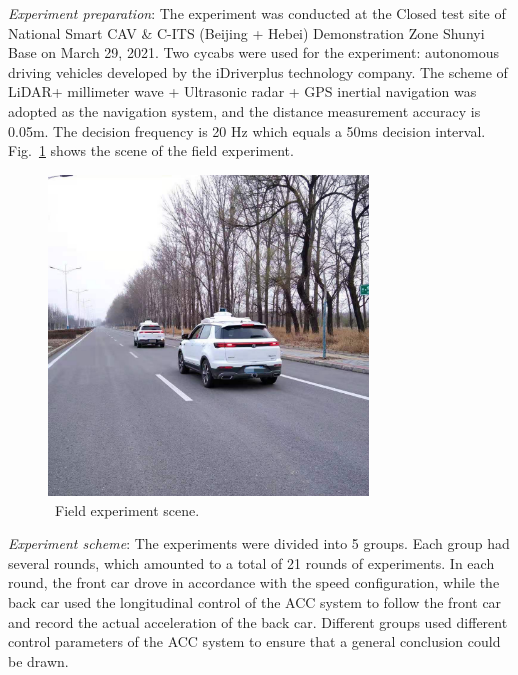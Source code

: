 \documentclass[journal]{IEEEtran}
\begin{document}
\textit{Experiment preparation}: The experiment was conducted at the Closed test site of National Smart CAV \& C-ITS (Beijing + Hebei) Demonstration Zone Shunyi Base on March 29, 2021. Two cycabs were used for the experiment: autonomous driving vehicles developed by the iDriverplus technology company. The scheme of LiDAR+ millimeter wave + Ultrasonic radar + GPS inertial navigation was adopted as the navigation system, and the distance measurement accuracy is 0.05m. The decision frequency is 20 Hz which equals a 50ms decision interval. Fig.~\ref{experiment} shows the scene of the field experiment.

\begin{figure}
  \centering
  \includegraphics[width=8.5cm]{figs/experiment.jpg}
  \caption{~Field experiment scene.}
  \label{experiment}
\end{figure}

\textit{Experiment scheme}: The experiments were divided into 5 groups. Each group had several rounds, which amounted to a total of 21 rounds of experiments. In each round, the front car drove in accordance with the speed configuration, while the back car used the longitudinal control of the ACC system to follow the front car and record the actual acceleration of the back car. Different groups used different control parameters of the ACC system to ensure that a general conclusion could be drawn.
\end{document}
